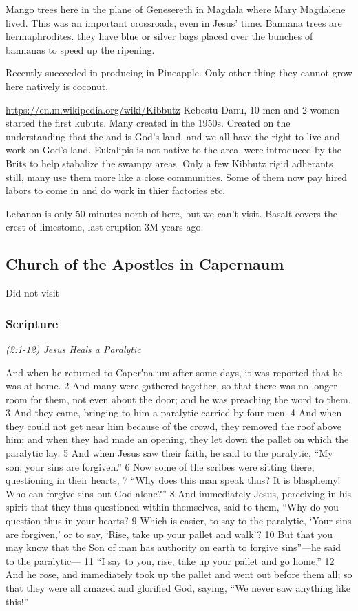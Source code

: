 \documentclass[letterpaper]{report}
\begin{document}
Mango trees here in the plane of Genesereth in Magdala where Mary Magdalene lived.
This was an important crossroads, even in Jesus' time. Bannana trees are hermaphrodites. they have blue or silver bags placed over the bunches of bannanas to speed up the ripening.

Recently succeeded in producing in Pineapple. Only other thing they cannot grow here natively is coconut.

\url{https://en.m.wikipedia.org/wiki/Kibbutz}
Kebestu Danu, 10 men and 2 women started the first kubuts. Many created in the 1950s.
Created on the understanding that the and is God's land, and we all have the right to live and work on God's land.
Eukalipis is not native to the area, were introduced by the Brits to help stabalize the swampy areas.
Only a few Kibbutz rigid adherants still, many use them more like a close communities.  Some of them now pay hired labors to come in and do work in thier factories etc.

Lebanon is only 50 minutes north of here,  but we can't visit.
Basalt covers the crest of limestome, last eruption 3M years ago.

\clearpage
\subsection{Church of the Apostles in Capernaum}
\begin{multicols}{2}
	Did not visit
\end{multicols}
\subsubsection{Scripture}

{\centering
	\emph{(2:1-12) Jesus Heals a Paralytic}\\
}
\begin{multicols}{2}
And when he returned to Caper′na-um after some days, it was reported that he was at home. 2 And many were gathered together, so that there was no longer room for them, not even about the door; and he was preaching the word to them. 3 And they came, bringing to him a paralytic carried by four men. 4 And when they could not get near him because of the crowd, they removed the roof above him; and when they had made an opening, they let down the pallet on which the paralytic lay. 5 And when Jesus saw their faith, he said to the paralytic, “My son, your sins are forgiven.” 6 Now some of the scribes were sitting there, questioning in their hearts, 7 “Why does this man speak thus? It is blasphemy! Who can forgive sins but God alone?” 8 And immediately Jesus, perceiving in his spirit that they thus questioned within themselves, said to them, “Why do you question thus in your hearts? 9 Which is easier, to say to the paralytic, ‘Your sins are forgiven,’ or to say, ‘Rise, take up your pallet and walk’? 10 But that you may know that the Son of man has authority on earth to forgive sins”—he said to the paralytic— 11 “I say to you, rise, take up your pallet and go home.” 12 And he rose, and immediately took up the pallet and went out before them all; so that they were all amazed and glorified God, saying, “We never saw anything like this!”
\end{multicols}
\end{document}
